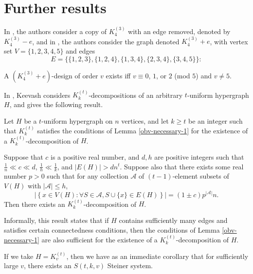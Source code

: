\section{Further results}

In \cite{feng-chang2}, the authors consider a copy of $K_4^{(3)}$ with an edge removed, denoted by $K_4^{(3)} - e$, and in \cite{feng-chang}, the authors consider the graph denoted $K_4^{(3)} + e$, with vertex set $V = \{1,2,3,4,5\}$ and edges \[E = \{\{1,2,3\},\{1,2,4\},\{1,3,4\},\{2,3,4\},\{3,4,5\}\}:\]

\begin{theorem}
A $(K_4^{(3)}+e)$-design of order $v$ exists iff $v \equiv 0$, $1$, or $2$ (mod $5$) and $v \neq 5$.
\end{theorem}

In \cite{keevash}, Keevash considers $K_{k}^{(t)}$-decompositions of an arbitrary $t$-uniform hypergraph $H$, and gives the following result.

\begin{theorem}
Let $H$ be a $t$-uniform hypergraph on $n$ vertices, and let $k \geq t$ be an integer such that $K_{k}^{(t)}$ satisfies
the conditions of Lemma \ref{obv-necessary-1} for the existence of a $K_{k}^{(t)}$-decomposition of $H$.

Suppose that $c$ is a positive real number, and $d, h$ are positive integers such that $\frac{1}{n} \ll c \ll d$, $\frac{1}{h} \ll \frac{1}{k}$, and $|E(H)| > dn^t$. Suppose also that there exists some real number $p > 0$ such that for any collection $\mathcal{A}$ of $(t-1)$-element subsets of $V(H)$ with $|\mathcal{A}| \leq h$,
\[
    \left| \left\{ x \in V(H) : \forall S \in \mathcal{A}, S \cup \{x\} \in E(H) \right\} \right| = (1 \pm c) p^{|\mathcal{A}|} n.
\]
Then there exists an $K_{k}^{(t)}$-decomposition of $H$.
\end{theorem}

Informally, this result states that if $H$ contains sufficiently many edges and satisfies certain connectedness conditions, then the conditions of Lemma \ref{obv-necessary-1} are also sufficient for the existence of a $K_{k}^{(t)}$-decomposition of $H$.

If we take $H = K_{v}^{(t)}$, then we have as an immediate corollary that for sufficiently large $v$, there exists an $S(t, k, v)$ Steiner system.

